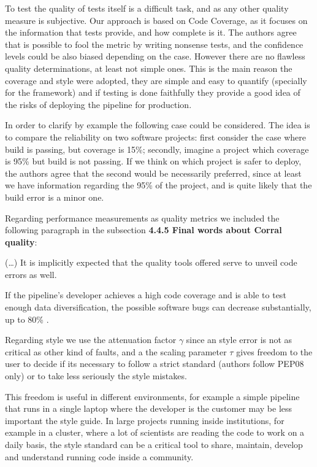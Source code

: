 \documentclass[a4paper,onecolumn,fleqn,usenatbib,useAMS]{mnrasr}
\newenvironment{frshaded}{%
\def\FrameCommand{\fboxrule=\FrameRule\fboxsep=\FrameSep \fcolorbox{framecolor}{shadecolor}}%
\MakeFramed {\FrameRestore}}%
{\endMakeFramed}
\begin{document}
To test the quality of tests itself is a difficult task, 
and as any other quality measure is subjective. 
%
Our approach is based on Code Coverage, as it focuses on 
the information that tests provide, and how complete is it.
%
The authors agree that is possible to fool the metric by
writing nonsense tests, and the confidence levels could be also
biased depending on the case. 
%
However there are no flawless quality determinations, at least
not simple ones. This is the main reason the coverage and style
were adopted, they are simple and easy to quantify (specially
for the framework) and if testing is done faithfully they provide
a good idea of the risks of deploying the pipeline for production.
%

In order to clarify by example the following case could be considered.
%
The idea is to compare the reliability on two software projects:
first consider the case where build is passing, but coverage is 15\%; secondly,
imagine a project which coverage is 95\% but build is not passing. 
%
If we think on which project is safer to deploy, the authors agree 
that the second would be necessarily preferred, since at least we have
information regarding the 95\% of the project, and is quite likely that
the build error is a minor one.

Regarding performance measurements as quality metrics we included the following
paragraph in the subsection \textbf{4.4.5 Final words about Corral quality}:

\begin{frshaded}
\begin{multicols}{2}   
(\ldots)
%
It is implicitly expected that the quality tools offered serve to unveil code errors as well.

If the pipeline's developer achieves a high code coverage and is able to test enough data
diversification, the possible software bugs can decrease substantially, up to 80\% \citep{jeffries2007guest}.
%
\end{multicols} \end{frshaded} 

Regarding style we use the attenuation factor $\gamma$
since an style error is not as critical as other kind
of faults, and a the scaling parameter $\tau$ 
gives freedom to the user to decide if its necessary
to follow a strict standard (authors follow PEP08 only) or to take less
seriously the style mistakes. 

This freedom is useful in different environments,
for example a simple pipeline that runs in a single laptop where the developer
is the customer may be less important the style guide.
%
In large projects running inside institutions, for 
example in a cluster, where a lot of scientists are reading the
code to work on a daily basis, the style standard can be a critical tool to
share, maintain, develop and understand running code inside a community.
\end{document}
